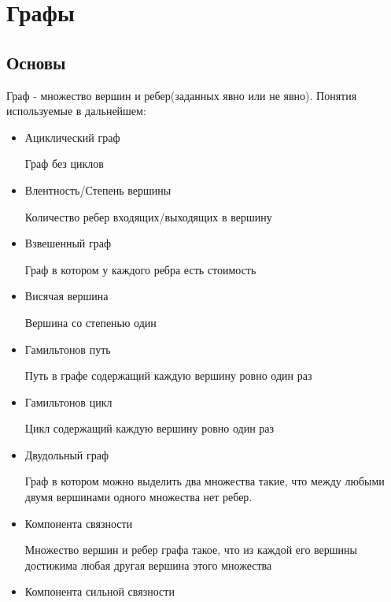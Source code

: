 \chapter{Графы}
\section{Основы}
Граф - множество вершин и ребер(заданных явно или не явно). Понятия используемые в дальнейшем:
\begin{itemize} 
\item 
    Ациклический граф
    \begin{mydef}
        Граф без циклов
    \end{mydef}
\item     
    Влентность/Степень вершины
    \begin{mydef}
        Количество ребер входящих/выходящих в вершину
    \end{mydef}
\item     
    Взвешенный граф
    \begin{mydef}
        Граф в котором у каждого ребра есть стоимость
    \end{mydef}
\item     
    Висячая вершина
    \begin{mydef}
        Вершина со степенью один
    \end{mydef}
\item     
    Гамильтонов путь
    \begin{mydef}
        Путь в графе содержащий каждую вершину ровно один раз
    \end{mydef}
\item     
    Гамильтонов цикл
    \begin{mydef}
        Цикл содержащий каждую вершину ровно один раз
    \end{mydef}
\item     
    Двудольный граф
    \begin{mydef}
        Граф в котором можно выделить два множества такие, что между любыми двумя вершинами одного множества нет ребер.
    \end{mydef}
\item     
    Компонента связности
    \begin{mydef}
        Множество вершин и ребер графа такое, что из каждой его вершины
        достижима любая другая вершина этого множества
    \end{mydef}
\item     
    Компонента сильной связности

\end{itemize}
